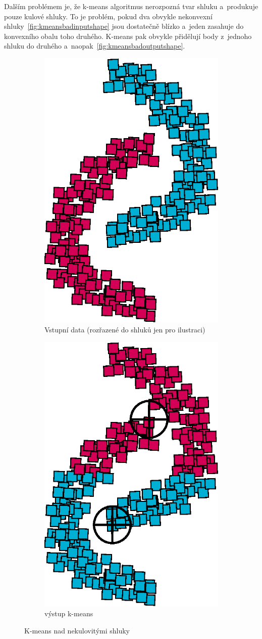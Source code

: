Dalším problémem je, že k-means algoritmus nerozpozná tvar shluku a~produkuje pouze kulové shluky. To je problém, pokud dva obvykle nekonvexní shluky~\autoref{fig:kmeansbadinputshape} jsou dostatečně blízko a~jeden zasahuje do konvexního obalu toho druhého. K-means pak obvykle přidělují body z~jednoho shluku do druhého a~naopak~\autoref{fig:kmeansbadoutputshape}.\\
\begin{figure}[h]
\begin{subfigure}{.49\textwidth}
  \centering
  \includegraphics[width=.5\linewidth]{img/kmeans_badInputSampleShape.eps}
  \caption{Vstupní data (rozřazené do shluků jen pro ilustraci)}
  \label{fig:kmeansbadinputshape}
\end{subfigure}
\begin{subfigure}{.49\textwidth}
  \centering
  \includegraphics[width=.5\linewidth]{img/kmeans_badOutputSampleShape.eps}
  \caption{výstup k-means}
  \label{fig:kmeansbadoutputshape}
\end{subfigure}
\caption{K-means nad nekulovitými shluky}
\end{figure}

